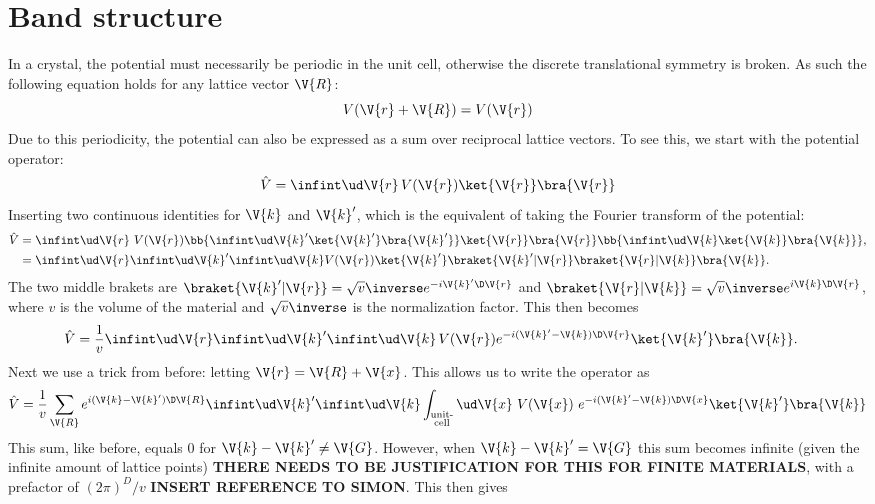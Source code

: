 \documentclass[main.tex]{subfiles}
\begin{document}
	
	\section{Band structure}
	In a crystal, the potential must necessarily be periodic in the unit cell, otherwise the discrete translational symmetry is broken. As such the following equation holds for any lattice vector $ \V{R} $:
	\begin{equation}\label{eq:band_period_V}
		V(\V{r}+\V{R}) = V(\V{r})
	\end{equation}
	Due to this periodicity, the potential can also be expressed as a sum over reciprocal lattice vectors. To see this, we start with the potential operator:
	\begin{equation}\label{key}
		\hat{V} = \infint \ud \V{r} \, V(\V{r}) \ket{\V{r}}\bra{\V{r}}
	\end{equation}
	Inserting two continuous identities for $ \V{k} $ and $ \V{k}' $, which is the equivalent of taking the Fourier transform of the potential: 
	\begin{align}\label{key}
		\hat{V} &= \infint \ud \V{r}\ V(\V{r}) \bb{\infint \ud \V{k}' \ket{\V{k}'} \bra{\V{k}'}} \ket{\V{r}}\bra{\V{r}} \bb{\infint \ud \V{k} \ket{\V{k}} \bra{\V{k}}}, \\
		&= \infint \ud\V{r} \infint \ud \V{k}' \infint \ud \V{k} V(\V{r}) \ket{\V{k}'} \braket{\V{k}' | \V{r}} \braket{\V{r} | \V{k}} \bra{\V{k}}.
	\end{align}
	The two middle brakets are $ \braket{\V{k}'| \V{r}}= \sqrt{v}\inverse e^{-i \V{k}' \D \V{r}} $ and $ \braket{\V{r} | \V{k}} = \sqrt{v}\inverse e^{i \V{k} \D \V{r}} $,  where $ v $ is the volume of the material and $ \sqrt{v}\inverse $ is the normalization factor. This then becomes
	\begin{align}\label{key}
		\hat{V} &= \frac{1}{v} \infint \ud\V{r} \infint \ud \V{k}' \infint \ud \V{k}\, V(\V{r}) e^{-i(\V{k}'-\V{k}) \D \V{r}} \ket{\V{k}'} \bra{\V{k}}.
	\end{align}
	Next we use a trick from before: letting $ \V{r} = \V{R} + \V{x} $. This allows us to write the operator as
	\begin{equation}\label{key}
		\hat{V} = \frac{1}{v} \sum_{\V{R}} e^{i(\V{k}-\V{k}') \D \V{R}} \infint \ud \V{k}' \infint \ud \V{k} \int_{\substack{\text{unit-} \\\text{cell}}} \ud \V{x}\ V(\V{x})\  e^{-i (\V{k}'-\V{k}) \D \V{x}} \ket{\V{k}'} \bra{\V{k}}
	\end{equation}
	This sum, like before, equals 0 for $ \V{k}-\V{k}' \neq \V{G} $. However, when $ \V{k}-\V{k}' = \V{G} $ this sum becomes infinite (given the infinite amount of lattice points) \textbf{THERE NEEDS TO BE JUSTIFICATION FOR THIS FOR FINITE MATERIALS}, with a prefactor of $ (2\pi)^D/v $ \textbf{INSERT REFERENCE TO SIMON}. This then gives
\end{document}
